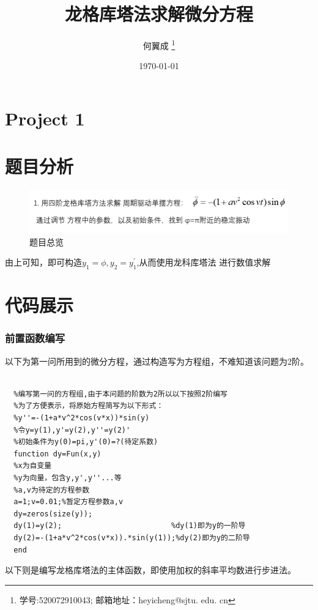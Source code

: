 \documentclass[UTF8,a4paper,10pt]{ctexart}
\title{\textbf{龙格库塔法求解微分方程}}
\author{ 何翼成 \thanks{学号:520072910043; \newline
    邮箱地址：heyicheng@sjtu. edu. cn} }
\date{\today}
\begin{document}
\maketitle

\section*{Project 1}
\section{题目分析}
	\begin{figure}[!htbp]
		\centering
		\includegraphics[width=1\textwidth,height=0.2\textwidth]{pictures/project1.png}
		\caption{题目总览} \label{project1}
	\end{figure}
  由上可知，即可构造$y_{1}=\phi ,y_{2}=y_{1}^{'}$,从而使用龙科库塔法
  进行数值求解


\section{代码展示}

\subsubsection{前置函数编写}
以下为第一问所用到的微分方程，通过构造写为方程组，不难知道该问题为2阶。\newline
~\\
\lstset{language=matlab}
\begin{lstlisting}
  %编写第一问的方程组,由于本问题的阶数为2所以以下按照2阶编写
  %为了方便表示，将原始方程简写为以下形式：
  %y''=-(1+a*v^2*cos(v*x))*sin(y)
  %令y=y(1),y'=y(2),y''=y(2)'
  %初始条件为y(0)=pi,y'(0)=?(待定系数)
  function dy=Fun(x,y)
  %x为自变量
  %y为向量，包含y,y',y''...等
  %a,v为待定的方程参数
  a=1;v=0.01;%暂定方程参数a,v
  dy=zeros(size(y));
  dy(1)=y(2);                         %dy(1)即为y的一阶导
  dy(2)=-(1+a*v^2*cos(v*x)).*sin(y(1));%dy(2)即为y的二阶导
  end
\end{lstlisting}
以下则是编写龙格库塔法的主体函数，即使用加权的斜率平均数进行步进法。\newline
\end{document}
